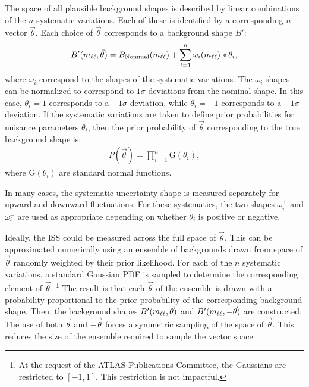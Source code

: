 The space of all plausible background shapes is described by linear combinations of the $n$ systematic variations.
Each of these is identified by a corresponding $n$-vector $\vec{\theta}$.
Each choice of $\vec{\theta}$ corresponds to a background shape $B'$:
\begin{equation}\begin{split}
    B'(m_{\ell\ell},\vec{\theta}) = B_\text{Nominal}(m_{\ell\ell}) + \sum_{i=1}^n \omega_i(m_{\ell\ell})*\theta_i,
\end{split}\end{equation} 
where $\omega_i$ correspond to the shapes of the systematic variations.
The $\omega_i$ shapes can be normalized to correspond to $1\sigma$ deviations from the nominal shape.
In this case, $\theta_i=1$ corresponds to a $+1\sigma$ deviation, while $\theta_i=-1$ corresponds to a $-1\sigma$ deviation.
If the systematic variations are taken to define prior probabilities for nuisance parameters $\theta_i$, then the prior probability of $\vec{\theta}$ corresponding to the true background shape is:
\begin{equation}\begin{split}
    P(\vec{\theta})=\prod_{i=1}^n \text{G}(\theta_i),
\end{split}\end{equation} 
where $\text{G}(\theta_i)$ are standard normal functions.

In many cases, the systematic uncertainty shape is measured separately for upward and downward fluctuations.
For these systematics, the two shapes $\omega^+_i$ and $\omega^-_i$ are used as appropriate depending on whether $\theta_i$ is positive or negative.

Ideally, the ISS could be measured across the full space of $\vec{\theta}$.
This can be approximated numerically using an ensemble of backgrounds drawn from space of $\vec{\theta}$ randomly weighted by their prior likelihood.
For each of the $n$ systematic variations, a standard Gaussian PDF is sampled to determine the corresponding element of $\vec{\theta}$. \footnote{At the request of the ATLAS Publications Committee, the Gaussians are restricted to $[-1,1]$. This restriction is not impactful.}
The result is that each $\vec{\theta}$ of the ensemble is drawn with a probability proportional to the prior probability of the corresponding background shape.
Then, the background shapes $B'(m_{\ell\ell},\vec{\theta})$ and $B'(m_{\ell\ell},-\vec{\theta})$ are constructed.
The use of both $\vec{\theta}$ and $-\vec{\theta}$ forces a symmetric sampling of the space of $\vec{\theta}$. 
This reduces the size of the ensemble required to sample the vector space.

